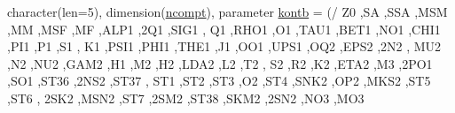 \begin{DoxyCompactItemize}
character(len=5), dimension(\mbox{\hyperlink{namespacemoduletoga_a151be23f63401a1bb1a76f0a4c30d9ca}{ncompt}}), parameter \mbox{\hyperlink{namespacemoduletoga_a9443f9f365057429abfbafa77dce1caf}{kontb}} = (/ \textquotesingle{}Z0 \textquotesingle{},\textquotesingle{}SA \textquotesingle{},\textquotesingle{}S\+SA \textquotesingle{},\textquotesingle{}M\+SM \textquotesingle{},\textquotesingle{}MM \textquotesingle{},\textquotesingle{}M\+SF \textquotesingle{},\textquotesingle{}MF \textquotesingle{},\textquotesingle{}A\+L\+P1 \textquotesingle{},\textquotesingle{}2\+Q1 \textquotesingle{},\textquotesingle{}\+S\+I\+G1 \textquotesingle{}, \textquotesingle{}\+Q1 \textquotesingle{},\textquotesingle{}\+R\+H\+O1 \textquotesingle{},\textquotesingle{}\+O1 \textquotesingle{},\textquotesingle{}\+T\+A\+U1 \textquotesingle{},\textquotesingle{}\+B\+E\+T1 \textquotesingle{},\textquotesingle{}\+N\+O1 \textquotesingle{},\textquotesingle{}\+C\+H\+I1 \textquotesingle{},\textquotesingle{}\+P\+I1 \textquotesingle{},\textquotesingle{}\+P1 \textquotesingle{},\textquotesingle{}\+S1 \textquotesingle{}, \textquotesingle{}\+K1 \textquotesingle{},\textquotesingle{}\+P\+S\+I1 \textquotesingle{},\textquotesingle{}\+P\+H\+I1 \textquotesingle{},\textquotesingle{}\+T\+H\+E1 \textquotesingle{},\textquotesingle{}\+J1 \textquotesingle{},\textquotesingle{}\+O\+O1 \textquotesingle{},\textquotesingle{}\+U\+P\+S1 \textquotesingle{},\textquotesingle{}\+O\+Q2 \textquotesingle{},\textquotesingle{}\+E\+P\+S2 \textquotesingle{},\textquotesingle{}2\+N2 \textquotesingle{}, \textquotesingle{}\+M\+U2 \textquotesingle{},\textquotesingle{}\+N2 \textquotesingle{},\textquotesingle{}\+N\+U2 \textquotesingle{},\textquotesingle{}\+G\+A\+M2 \textquotesingle{},\textquotesingle{}\+H1 \textquotesingle{},\textquotesingle{}\+M2 \textquotesingle{},\textquotesingle{}\+H2 \textquotesingle{},\textquotesingle{}\+L\+D\+A2 \textquotesingle{},\textquotesingle{}\+L2 \textquotesingle{},\textquotesingle{}\+T2 \textquotesingle{}, \textquotesingle{}\+S2 \textquotesingle{},\textquotesingle{}\+R2 \textquotesingle{},\textquotesingle{}\+K2 \textquotesingle{},\textquotesingle{}\+E\+T\+A2 \textquotesingle{},\textquotesingle{}\+M3 \textquotesingle{},\textquotesingle{}2\+P\+O1 \textquotesingle{},\textquotesingle{}\+S\+O1 \textquotesingle{},\textquotesingle{}\+S\+T36 \textquotesingle{},\textquotesingle{}2\+N\+S2 \textquotesingle{},\textquotesingle{}\+S\+T37 \textquotesingle{}, \textquotesingle{}\+S\+T1 \textquotesingle{},\textquotesingle{}\+S\+T2 \textquotesingle{},\textquotesingle{}\+S\+T3 \textquotesingle{},\textquotesingle{}\+O2 \textquotesingle{},\textquotesingle{}\+S\+T4 \textquotesingle{},\textquotesingle{}\+S\+N\+K2 \textquotesingle{},\textquotesingle{}\+O\+P2 \textquotesingle{},\textquotesingle{}\+M\+K\+S2 \textquotesingle{},\textquotesingle{}\+S\+T5 \textquotesingle{},\textquotesingle{}\+S\+T6 \textquotesingle{}, \textquotesingle{}2\+S\+K2 \textquotesingle{},\textquotesingle{}\+M\+S\+N2 \textquotesingle{},\textquotesingle{}\+S\+T7 \textquotesingle{},\textquotesingle{}2\+S\+M2 \textquotesingle{},\textquotesingle{}\+S\+T38 \textquotesingle{},\textquotesingle{}\+S\+K\+M2 \textquotesingle{},\textquotesingle{}2\+S\+N2 \textquotesingle{},\textquotesingle{}\+N\+O3 \textquotesingle{},\textquotesingle{}\+M\+O3 
\end{DoxyCompactItemize}
